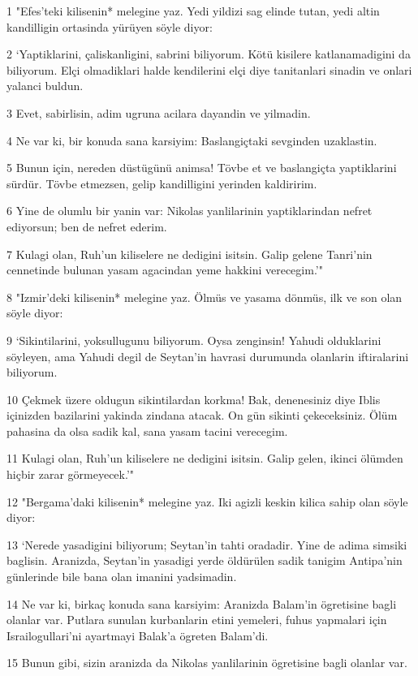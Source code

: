 \par 1 "Efes'teki kilisenin* melegine yaz. Yedi yildizi sag elinde tutan, yedi altin kandilligin ortasinda yürüyen söyle diyor:
\par 2 `Yaptiklarini, çaliskanligini, sabrini biliyorum. Kötü kisilere katlanamadigini da biliyorum. Elçi olmadiklari halde kendilerini elçi diye tanitanlari sinadin ve onlari yalanci buldun.
\par 3 Evet, sabirlisin, adim ugruna acilara dayandin ve yilmadin.
\par 4 Ne var ki, bir konuda sana karsiyim: Baslangiçtaki sevginden uzaklastin.
\par 5 Bunun için, nereden düstügünü animsa! Tövbe et ve baslangiçta yaptiklarini sürdür. Tövbe etmezsen, gelip kandilligini yerinden kaldiririm.
\par 6 Yine de olumlu bir yanin var: Nikolas yanlilarinin yaptiklarindan nefret ediyorsun; ben de nefret ederim.
\par 7 Kulagi olan, Ruh'un kiliselere ne dedigini isitsin. Galip gelene Tanri'nin cennetinde bulunan yasam agacindan yeme hakkini verecegim.'"
\par 8 "Izmir'deki kilisenin* melegine yaz. Ölmüs ve yasama dönmüs, ilk ve son olan söyle diyor:
\par 9 `Sikintilarini, yoksullugunu biliyorum. Oysa zenginsin! Yahudi olduklarini söyleyen, ama Yahudi degil de Seytan'in havrasi durumunda olanlarin iftiralarini biliyorum.
\par 10 Çekmek üzere oldugun sikintilardan korkma! Bak, denenesiniz diye Iblis içinizden bazilarini yakinda zindana atacak. On gün sikinti çekeceksiniz. Ölüm pahasina da olsa sadik kal, sana yasam tacini verecegim.
\par 11 Kulagi olan, Ruh'un kiliselere ne dedigini isitsin. Galip gelen, ikinci ölümden hiçbir zarar görmeyecek.'"
\par 12 "Bergama'daki kilisenin* melegine yaz. Iki agizli keskin kilica sahip olan söyle diyor:
\par 13 `Nerede yasadigini biliyorum; Seytan'in tahti oradadir. Yine de adima simsiki baglisin. Aranizda, Seytan'in yasadigi yerde öldürülen sadik tanigim Antipa'nin günlerinde bile bana olan imanini yadsimadin.
\par 14 Ne var ki, birkaç konuda sana karsiyim: Aranizda Balam'in ögretisine bagli olanlar var. Putlara sunulan kurbanlarin etini yemeleri, fuhus yapmalari için Israilogullari'ni ayartmayi Balak'a ögreten Balam'di.
\par 15 Bunun gibi, sizin aranizda da Nikolas yanlilarinin ögretisine bagli olanlar var.
